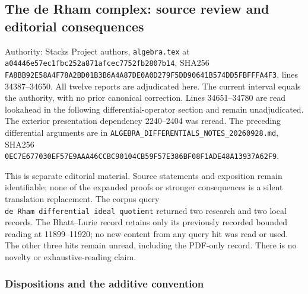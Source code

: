 \subsection{The de Rham complex: source review and editorial consequences}\label{algebra-proof-042-the-de-rham-complex-source-review-and-editorial-consequences}

Authority: Stacks Project authors, \texttt{algebra.tex} at \texttt{a044\allowbreak{}46e5\allowbreak{}7ec1\allowbreak{}fbc2\allowbreak{}52a8\allowbreak{}71af\allowbreak{}cec7\allowbreak{}752f\allowbreak{}b280\allowbreak{}7b14}, SHA256 \texttt{FA8B\allowbreak{}B92E\allowbreak{}58A4\allowbreak{}F78A\allowbreak{}2BD0\allowbreak{}1B3B\allowbreak{}6A4A\allowbreak{}87DE\allowbreak{}0A0D\allowbreak{}279F\allowbreak{}5DD9\allowbreak{}0641\allowbreak{}B574\allowbreak{}DD5F\allowbreak{}BFFF\allowbreak{}A4F3}, lines 34387--34650. All twelve reports are adjudicated here. The current interval equals the authority, with no prior canonical correction. Lines 34651--34780 are read lookahead in the following differential-operator section and remain unadjudicated. The exterior presentation dependency 2240--2404 was reread. The preceding differential arguments are in \texttt{ALGEBRA\_\allowbreak{}DIFFERENTIAL\allowbreak{}S\_\allowbreak{}NOTES\_\allowbreak{}20260928.\allowbreak{}md}, SHA256 \texttt{0EC7\allowbreak{}E677\allowbreak{}030E\allowbreak{}F57E\allowbreak{}9AAA\allowbreak{}46CC\allowbreak{}BC90\allowbreak{}104C\allowbreak{}B59F\allowbreak{}57E3\allowbreak{}86BF\allowbreak{}08F1\allowbreak{}ADE4\allowbreak{}8A13\allowbreak{}937A\allowbreak{}62F9}.

This is separate editorial material. Source statements and exposition remain identifiable; none of the expanded proofs or stronger consequences is a silent translation replacement. The corpus query \texttt{de\ Rham\ differential\ ideal\ quotient} returned two research and two local records. The Bhatt--Lurie record retains only its previously recorded bounded reading at 11899--11920; no new content from any query hit was read or used. The other three hits remain unread, including the PDF-only record. There is no novelty or exhaustive-reading claim.

\subsubsection{Dispositions and the additive convention}\label{algebra-proof-042-dispositions-and-the-additive-convention}

